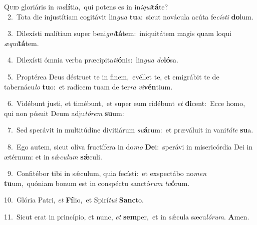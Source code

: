 \lettrine{\initial\textcolor{\initialcolor}{Q}}{uid} gloriáris in \textit{ma}\-\textbf{lí}tia,~\star qui potens es in in\-\textit{i}\-\textit{qui}\textbf{tá}te?\\
{\numbfont\textcolor{\numbcolor}{~2.}}~Tota die injustítiam cogitávit lin\textit{gua} \textbf{tu}\-a:~\star sicut novácula acúta fe\-\textit{cís}\-\textit{ti} \textbf{do}\-lum.\par
{\numbfont\textcolor{\numbcolor}{~3.}}~Dilexísti malítiam super beni\-\textit{gni}\-\textbf{tá}tem:~\star iniquitátem magis quam loqui \textit{æ}\-\textit{qui}\textbf{tá}tem.\par
{\numbfont\textcolor{\numbcolor}{~4.}}~Dilexísti ómnia verba præcipita\-\textit{ti}\-\textbf{ó}nis:~\star lin\textit{gua} \textit{do}\-\textbf{ló}sa.\par
{\numbfont\textcolor{\numbcolor}{~5.}}~Proptérea Deus déstruet te in finem,~\dagger evéllet te, et emigrábit te de tabernácu\textit{lo} \textbf{tu}\-o:~\star et radícem tuam de ter\textit{ra} \textit{vi}\-\textbf{vén}tium.\par
{\numbfont\textcolor{\numbcolor}{~6.}}~Vidébunt justi, et timébunt,~\dagger et super eum ridébunt \textit{et} \textbf{di}\-cent:~\star Ecce homo, qui non pósuit Deum adju\-\textit{tó}\-\textit{rem} \textbf{su}\-um:\par
{\numbfont\textcolor{\numbcolor}{~7.}}~Sed sperávit in multitúdine divitiárum \textit{su}\-\textbf{á}rum:~\star et præváluit in vani\-\textit{tá}\-\textit{te} \textbf{su}\-a.\par
{\numbfont\textcolor{\numbcolor}{~8.}}~Ego autem, sicut olíva fructífera in do\textit{mo} \textbf{De}\-i:~\star sperávi in misericórdia Dei in ætérnum: et in sǽ\-\textit{cu}\-\textit{lum} \textbf{sǽ}\-culi.\par
{\numbfont\textcolor{\numbcolor}{~9.}}~Confitébor tibi in sǽculum, quia fecísti:~\dagger et exspectábo no\textit{men} \textbf{tu}\-um,~\star quóniam bonum est in conspéctu sanctó\textit{rum} \textit{tu}\-\textbf{ó}rum.\par
{\numbfont\textcolor{\numbcolor}{10.}}~Glória Patri, \textit{et} \textbf{Fí}\-lio,~\star et Spirí\-\textit{tu}\-\textit{i} \textbf{Sanc}\-to.\par
{\numbfont\textcolor{\numbcolor}{11.}}~Sicut erat in princípio, et nunc, \textit{et} \textbf{sem}\-per,~\star et in sǽcula sæcu\-\textit{ló}\-\textit{rum}. \textbf{A}\-men.\par
